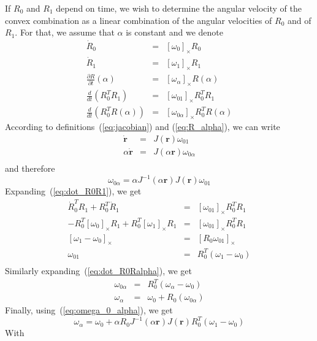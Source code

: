 \documentclass {article}
\newcommand\rot{\mathbf{r}}
\newcommand\cross[1]{[#1]_{\times}}
\begin{document}
If $R_0$ and $R_1$ depend on time, we wish to determine the angular
velocity of the convex combination as a linear combination of the angular
velocities of $R_0$ and of $R_1$. For that, we assume that $\alpha$ is constant
and we denote
\begin{eqnarray}
\dot{R}_0 &=& \cross{\omega_0} R_0 \\
\dot{R}_1 &=& \cross{\omega_1} R_1 \\
\frac{\partial R}{\partial t} (\alpha) &=& \cross{\omega_\alpha} R (\alpha) \\
\label{eq:dot_R0R1}
\frac{d}{dt} (R_0^T R_1) &=& \cross{\omega_{01}}R_0^T R_1 \\
\label{eq:dot_R0Ralpha}
\frac{d}{dt} (R_0^T R(\alpha)) &=& \cross{\omega_{0\alpha}}R_0^T R(\alpha)
\end{eqnarray}
According to definitions~(\ref{eq:jacobian}) and (\ref{eq:R_alpha}),
we can write
\begin{eqnarray*}
\dot{\rot} &=& J(\rot)\omega_{01}\\
\alpha\dot{\rot} &=& J(\alpha\rot)\omega_{0\alpha}\\
\end{eqnarray*}
and therefore
\begin{equation}\label{eq:omega_0_alpha}
\omega_{0\alpha} = \alpha J^{-1}(\alpha\rot) J(\rot)\omega_{01}
\end{equation}
Expanding~(\ref{eq:dot_R0R1}), we get
\begin{eqnarray*}
\dot{R}_0^T R_1 + R_0^T \dot{R}_1 &=& \cross{\omega_{01}}R_0^T R_1 \\
-R_0^T\cross{\omega_0} R_1 + R_0^T \cross{\omega_1}{R}_1 &=& \cross{\omega_{01}}R_0^T R_1 \\
\cross{\omega_1 - \omega_0} &=& \cross{R_0\omega_{01}}\\
\omega_{01} &=& R_0^T(\omega_1 - \omega_0)\\
\end{eqnarray*}
Similarly expanding~(\ref{eq:dot_R0Ralpha}), we get
\begin{eqnarray*}
\omega_{0\alpha} &=& R_0^T(\omega_{\alpha} - \omega_0)\\
\omega_{\alpha} &=& \omega_0 + R_0 (\omega_{0\alpha})
\end{eqnarray*}
Finally, using~(\ref{eq:omega_0_alpha}), we get
$$
\omega_{\alpha} = \omega_0 + \alpha R_0 J^{-1}(\alpha\rot) J(\rot)R_0^T(\omega_1 - \omega_0)
$$
With
\end{document}
